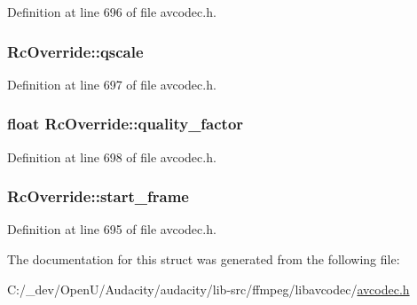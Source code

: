 Definition at line 696 of file avcodec.\+h.

\subsubsection[{\texorpdfstring{qscale}{qscale}}]{ Rc\+Override\+::qscale}\hypertarget{struct_rc_override_ab19147a3f876e82f52405f6d8a831915}{}\label{struct_rc_override_ab19147a3f876e82f52405f6d8a831915}


Definition at line 697 of file avcodec.\+h.

\subsubsection[{\texorpdfstring{quality\+\_\+factor}{quality_factor}}]{\setlength{\rightskip}{0pt plus 5cm}float Rc\+Override\+::quality\+\_\+factor}\hypertarget{struct_rc_override_aeaf7e06332eed4f0d9f900178a8faa83}{}\label{struct_rc_override_aeaf7e06332eed4f0d9f900178a8faa83}


Definition at line 698 of file avcodec.\+h.

\subsubsection[{\texorpdfstring{start\+\_\+frame}{start_frame}}]{ Rc\+Override\+::start\+\_\+frame}\hypertarget{struct_rc_override_adba2ede2813367b12a1060571ecac63c}{}\label{struct_rc_override_adba2ede2813367b12a1060571ecac63c}


Definition at line 695 of file avcodec.\+h.



The documentation for this struct was generated from the following file\+:\begin{DoxyCompactItemize}
\item 
C\+:/\+\_\+dev/\+Open\+U/\+Audacity/audacity/lib-\/src/ffmpeg/libavcodec/\hyperlink{avcodec_8h}{avcodec.\+h}\end{DoxyCompactItemize}

